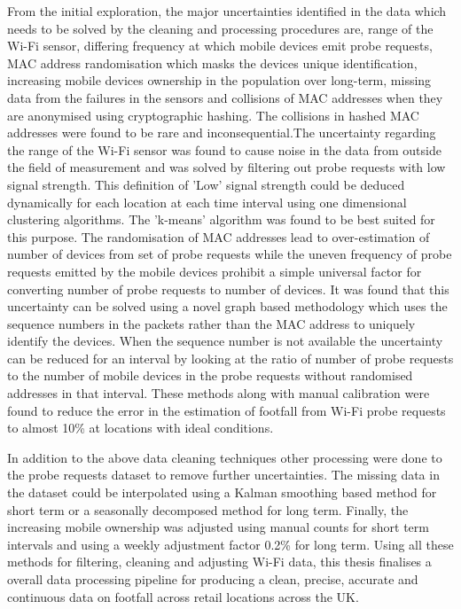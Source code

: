 From the initial exploration, the major uncertainties identified in the data which needs to be solved by the cleaning and processing procedures are, range of the Wi-Fi sensor, differing frequency at which mobile devices emit probe requests, MAC address randomisation which masks the devices unique identification, increasing mobile devices ownership in the population over long-term, missing data from the failures in the sensors and collisions of MAC addresses when they are anonymised using cryptographic hashing.
The collisions in hashed MAC addresses were found to be rare and inconsequential.The uncertainty regarding the range of the Wi-Fi sensor was found to cause noise in the data from outside the field of measurement and was solved by filtering out probe requests with low signal strength.
This definition of 'Low' signal strength could be deduced dynamically for each location at each time interval using one dimensional clustering algorithms.
The 'k-means' algorithm was found to be best suited for this purpose.
The randomisation of MAC addresses lead to over-estimation of number of devices from set of probe requests while the uneven frequency of probe requests emitted by the mobile devices prohibit a simple universal factor for converting number of probe requests to number of devices.
It was found that this uncertainty can be solved using a novel graph based methodology which uses the sequence numbers in the packets rather than the MAC address to uniquely identify the devices.
When the sequence number is not available the uncertainty can be reduced for an interval by looking at the ratio of number of probe requests to the number of mobile devices in the probe requests without randomised addresses in that interval.
These methods along with manual calibration were found to reduce the error in the estimation of footfall from Wi-Fi probe requests to almost 10\% at locations with ideal conditions.

In addition to the above data cleaning techniques other processing were done to the probe requests dataset to remove further uncertainties.
The missing data in the dataset could be interpolated using a Kalman smoothing based method for short term or a seasonally decomposed method for long term.
Finally, the increasing mobile ownership was adjusted using manual counts for short term intervals and using a weekly adjustment factor 0.2\% for long term.
Using all these methods for filtering, cleaning and adjusting Wi-Fi data, this thesis finalises a overall data processing pipeline for producing a clean, precise, accurate and continuous data on footfall across retail locations across the UK.

